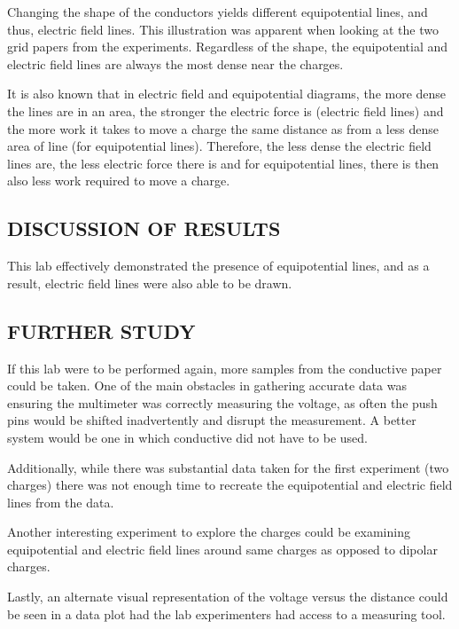 \documentclass [12pt, letterpaper, twoside] {article}
\begin{document}
Changing the shape of the conductors yields different equipotential lines, and thus, electric field lines. This illustration was apparent when looking at the two grid papers from the experiments. Regardless of the shape, the equipotential and electric field lines are always the most dense near the charges.

It is also known that in electric field and equipotential diagrams, the more dense the lines are in an area, the stronger the electric force is (electric field lines) and the more work it takes to move a charge the same distance as from a less dense area of line (for equipotential lines). Therefore, the less dense the electric field lines are, the less electric force there is and for equipotential lines, there is then also less work required to move a charge.

\subsection* {DISCUSSION OF RESULTS}
This lab effectively demonstrated the presence of equipotential lines, and as a result, electric field lines were also able to be drawn. 

\subsection* {FURTHER STUDY}
If this lab were to be performed again, more samples from the conductive paper could be taken. One of the main obstacles in gathering accurate data was ensuring the multimeter was correctly measuring the voltage, as often the push pins would be shifted inadvertently and disrupt the measurement. A better system would be one in which conductive did not have to be used.

Additionally, while there was substantial data taken for the first experiment (two charges) there was not enough time to recreate the equipotential and electric field lines from the data.

Another interesting experiment to explore the charges could be examining equipotential and electric field lines around same charges as opposed to dipolar charges.

Lastly, an alternate visual representation of the voltage versus the distance could be seen in a data plot had the lab experimenters had access to a measuring tool.
\end{document}
